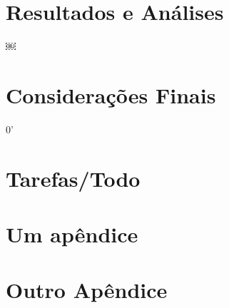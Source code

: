 \documentclass[
	phdproposta, %
	portugues %
]{modelo/ppgccufmg}
\begin{document}
        \chapter[Resultados e Análises]{Resultados e Análises}
        \label{Resultados e Análises}
        
￼
        \chapter[Considerações Finais]{Considerações Finais}
        \label{Considerações Finais}
        
        0'
        \renewcommand\bibname{References} %
        
        
		
        \begin{apendices}
        
            \chapter[Tarefas/Todo]{Tarefas/Todo}
            \label{Tarefas/Todo}
            
        
            \chapter{Um apêndice}
                \lipsum[1]
                
            \chapter{Outro Apêndice}
                \lipsum[2]
                
        \end{apendices}
		
\end{document}
